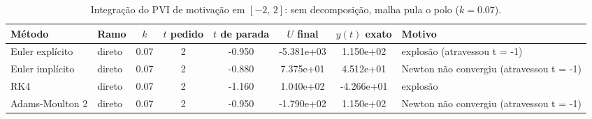 \begin{table}[H]
    \centering
    \small
    \begin{tabular}{llcccccl}
        \hline
        Método & Ramo & $k$ & $t$ pedido & $t$ de parada & $U$ final & $y(t)$ exato & Motivo \\
        \hline
        Euler explícito & direto & 0.07 & 2 & -0.950 & -5.381e+03 & 1.150e+02 & explosão (atravessou t = -1) \\
        Euler implícito & direto & 0.07 & 2 & -0.880 & 7.375e+01 & 4.512e+01 & Newton não convergiu (atravessou t = -1) \\
        RK4 & direto & 0.07 & 2 & -1.160 & 1.040e+02 & -4.266e+01 & explosão \\
        Adams-Moulton 2 & direto & 0.07 & 2 & -0.950 & -1.790e+02 & 1.150e+02 & Newton não convergiu (atravessou t = -1) \\
        \hline
    \end{tabular}
    \caption{Integração do PVI de motivação em $[-2,\, 2]$: sem decomposição, malha pula o polo ($k = 0.07$).}
    \label{tab:m2_2_sem_decomp_pula_polo}
\end{table}
